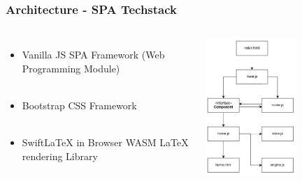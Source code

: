 \begin{frame}
    \frametitle{Architecture - SPA Techstack}
    \begin{columns}
            \begin{itemize}
                \item Vanilla JS SPA Framework (Web Programming Module) \\
                      ~
                \item Bootstrap CSS Framework \\ ~
                \item SwiftLaTeX in Browser WASM LaTeX rendering Library \\ ~
            \end{itemize}
            \includegraphics[width=0.6\textwidth]{../assets/spa_diagram.png}
    \end{columns}
\end{frame}

